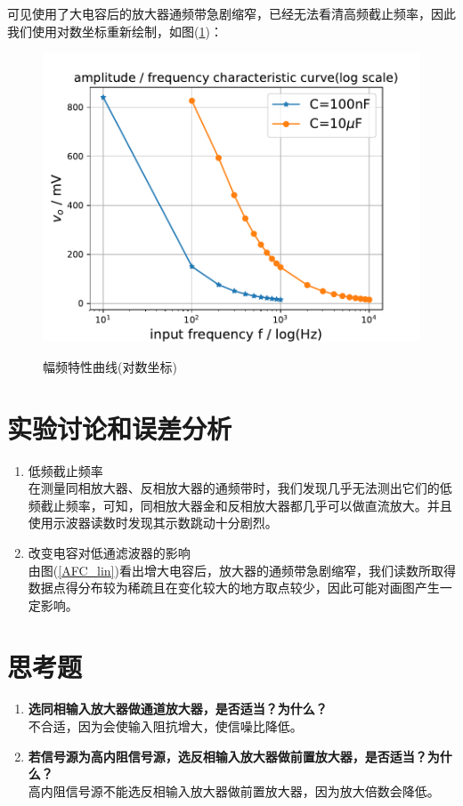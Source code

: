 \documentclass[a4paper]{article}
\begin{document}
可见使用了大电容后的放大器通频带急剧缩窄，已经无法看清高频截止频率，因此我们使用对数坐标重新绘制，如图(\ref{AFC_log})：
\begin{figure}[!h]
\centering
\includegraphics[width=14cm]{fig/AFC_log.pdf}\\
\caption{幅频特性曲线(对数坐标)}\label{AFC_log}
\end{figure}

\section{实验讨论和误差分析}
\begin{enumerate}
\item 低频截止频率\\
在测量同相放大器、反相放大器的通频带时，我们发现几乎无法测出它们的低频截止频率，可知，同相放大器金和反相放大器都几乎可以做直流放大。并且使用示波器读数时发现其示数跳动十分剧烈。
\item 改变电容对低通滤波器的影响\\
由图(\ref{AFC_lin})看出增大电容后，放大器的通频带急剧缩窄，我们读数所取得数据点得分布较为稀疏且在变化较大的地方取点较少，因此可能对画图产生一定影响。
\end{enumerate}

\section{思考题}
\begin{enumerate}
\item \textbf{选同相输入放大器做通道放大器，是否适当？为什么？}\\
不合适，因为会使输入阻抗增大，使信噪比降低。
\item \textbf{若信号源为高内阻信号源，选反相输入放大器做前置放大器，是否适当？为什么？}\\
高内阻信号源不能选反相输入放大器做前置放大器，因为放大倍数会降低。
\end{enumerate}

\nocite{jiaocai}

\end{document}
